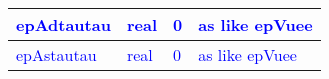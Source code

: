 \documentclass{article}
\begin{document}
\begin{longtable}{llll}
\midrule
\textcolor{blue}{epAdtautau} & \begin{minipage}[t]{2cm}\textcolor{blue}{real}\end{minipage} & \begin{minipage}[t]{2cm}\textcolor{blue}{0}\end{minipage} & \begin{minipage}[t]{12cm}\textcolor{blue}{as like epVuee}\end{minipage}\\*
\midrule
\textcolor{blue}{epAstautau} & \begin{minipage}[t]{2cm}\textcolor{blue}{real}\end{minipage} & \begin{minipage}[t]{2cm}\textcolor{blue}{0}\end{minipage} & \begin{minipage}[t]{12cm}\textcolor{blue}{as like epVuee}\end{minipage}\\*
\bottomrule
\end{longtable}
{ }



\end{document}
